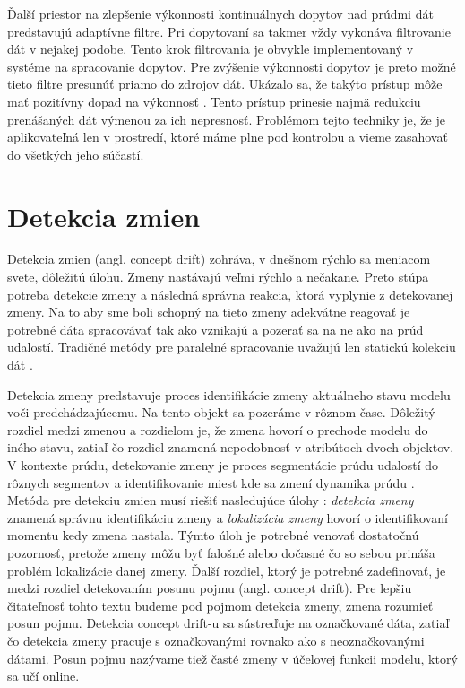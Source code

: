 Ďalší priestor na zlepšenie výkonnosti kontinuálnych dopytov nad prúdmi dát predstavujú adaptívne filtre. Pri dopytovaní sa takmer vždy vykonáva filtrovanie dát v nejakej podobe. Tento krok filtrovania je obvykle implementovaný v systéme na spracovanie dopytov. Pre zvýšenie výkonnosti dopytov je preto možné tieto filtre presunúť priamo do zdrojov dát. Ukázalo sa, že takýto prístup môže mať pozitívny dopad na výkonnosť \citep{olston2003adaptive}. Tento prístup prinesie najmä redukciu prenášaných dát výmenou za ich nepresnosť. Problémom tejto techniky je, že je aplikovateľná len v prostredí, ktoré máme plne pod kontrolou a vieme zasahovať do všetkých jeho súčastí.



\section{Detekcia zmien}
Detekcia zmien (angl. concept drift) zohráva, v dnešnom rýchlo sa meniacom svete, dôležitú úlohu. Zmeny nastávajú veľmi rýchlo a nečakane. Preto stúpa potreba detekcie zmeny a následná správna reakcia, ktorá vyplynie z detekovanej zmeny. Na to aby sme boli schopný na tieto zmeny adekvátne reagovať je potrebné dáta spracovávať tak ako vznikajú a pozerať sa na ne ako na prúd udalostí. Tradičné metódy pre paralelné spracovanie uvažujú len statickú kolekciu dát \citep{tran2014change}. \par
Detekcia zmeny predstavuje proces identifikácie zmeny aktuálneho stavu modelu voči predchádzajúcemu. Na tento objekt sa pozeráme v rôznom čase. Dôležitý rozdiel medzi zmenou a rozdielom je, že zmena hovorí o prechode modelu do iného stavu, zatiaľ čo rozdiel znamená nepodobnosť v atribútoch dvoch objektov. V kontexte prúdu, detekovanie zmeny je proces segmentácie prúdu udalostí do rôznych segmentov a identifikovanie miest kde sa zmení dynamika prúdu \citep{ross2009online}. Metóda pre detekciu zmien musí riešiť nasledujúce úlohy \citep{tran2014change}: \textit{detekcia zmeny} znamená správnu identifikáciu zmeny a \textit{lokalizácia zmeny} hovorí o identifikovaní momentu kedy zmena nastala. Týmto úloh je potrebné venovať dostatočnú pozornosť, pretože zmeny môžu byť falošné alebo dočasné čo so sebou prináša problém lokalizácie danej zmeny. Ďalší rozdiel, ktorý je potrebné zadefinovať, je medzi rozdiel detekovaním posunu pojmu (angl. concept drift). Pre lepšiu čitateľnosť tohto textu budeme pod pojmom detekcia zmeny, zmena rozumieť posun pojmu. Detekcia concept drift-u sa sústreďuje na označkované dáta, zatiaľ čo detekcia zmeny pracuje s označkovanými rovnako ako s neoznačkovanými dátami. Posun pojmu nazývame tiež časté zmeny v účelovej funkcii modelu, ktorý sa učí online. \par

